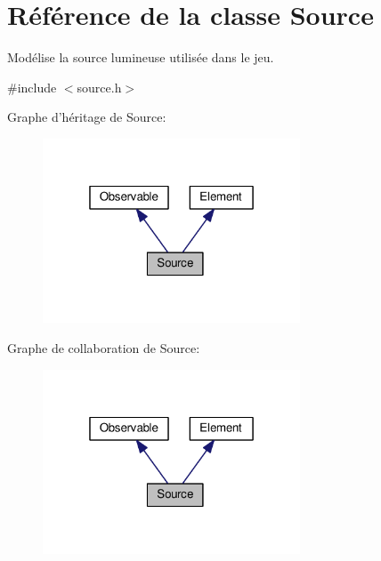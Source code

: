 \hypertarget{classSource}{\section{Référence de la classe Source}
\label{classSource}
}


Modélise la source lumineuse utilisée dans le jeu.  




{\ttfamily \#include $<$source.\+h$>$}



Graphe d'héritage de Source\+:
\nopagebreak
\begin{figure}[H]
\begin{center}
\leavevmode
\includegraphics[width=217pt]{da/d95/classSource__inherit__graph}
\end{center}
\end{figure}


Graphe de collaboration de Source\+:
\nopagebreak
\begin{figure}[H]
\begin{center}
\leavevmode
\includegraphics[width=217pt]{d1/d35/classSource__coll__graph}
\end{center}
\end{figure}
